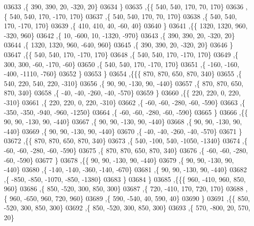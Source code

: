 \begin{DoxyCode}
03633     ,\{   390,   390,    20,  -320,    20\}
03634     \}
03635    ,\{\{   540,   540,   170,    70,   170\}
03636     ,\{   540,   540,   170,  -170,   170\}
03637     ,\{   540,   540,   170,    70,   170\}
03638     ,\{   540,   540,   170,  -170,   170\}
03639     ,\{   410,   410,    40,   -60,    40\}
03640     \}
03641    ,\{\{  1320,  1320,   960,  -320,   960\}
03642     ,\{    10,  -600,    10, -1320,  -970\}
03643     ,\{   390,   390,    20,  -320,    20\}
03644     ,\{  1320,  1320,   960,  -640,   960\}
03645     ,\{   390,   390,    20,  -320,    20\}
03646     \}
03647    ,\{\{   540,   540,   170,  -170,   170\}
03648     ,\{   540,   540,   170,  -170,   170\}
03649     ,\{   300,   300,   -60,  -170,   -60\}
03650     ,\{   540,   540,   170,  -170,   170\}
03651     ,\{  -160,  -160,  -400, -1110,  -760\}
03652     \}
03653    \}
03654   ,\{\{\{   870,   870,   650,   870,   340\}
03655     ,\{   540,   220,   540,   220,  -310\}
03656     ,\{    90,    90,  -130,    90,  -440\}
03657     ,\{   870,   870,   650,   870,   340\}
03658     ,\{   -40,   -40,  -260,   -40,  -570\}
03659     \}
03660    ,\{\{   220,   220,     0,   220,  -310\}
03661     ,\{   220,   220,     0,   220,  -310\}
03662     ,\{   -60,   -60,  -280,   -60,  -590\}
03663     ,\{  -350,  -350,  -940,  -960, -1250\}
03664     ,\{   -60,   -60,  -280,   -60,  -590\}
03665     \}
03666    ,\{\{    90,    90,  -130,    90,  -440\}
03667     ,\{    90,    90,  -130,    90,  -440\}
03668     ,\{    90,    90,  -130,    90,  -440\}
03669     ,\{    90,    90,  -130,    90,  -440\}
03670     ,\{   -40,   -40,  -260,   -40,  -570\}
03671     \}
03672    ,\{\{   870,   870,   650,   870,   340\}
03673     ,\{   540,  -100,   540, -1050, -1340\}
03674     ,\{   -60,   -60,  -280,   -60,  -590\}
03675     ,\{   870,   870,   650,   870,   340\}
03676     ,\{   -60,   -60,  -280,   -60,  -590\}
03677     \}
03678    ,\{\{    90,    90,  -130,    90,  -440\}
03679     ,\{    90,    90,  -130,    90,  -440\}
03680     ,\{  -140,  -140,  -360,  -140,  -670\}
03681     ,\{    90,    90,  -130,    90,  -440\}
03682     ,\{  -850,  -850, -1070,  -850, -1380\}
03683     \}
03684    \}
03685   ,\{\{\{   960,  -410,   960,   850,   960\}
03686     ,\{   850,  -520,   300,   850,   300\}
03687     ,\{   720,  -410,   170,   720,   170\}
03688     ,\{   960,  -650,   960,   720,   960\}
03689     ,\{   590,  -540,    40,   590,    40\}
03690     \}
03691    ,\{\{   850,  -520,   300,   850,   300\}
03692     ,\{   850,  -520,   300,   850,   300\}
03693     ,\{   570,  -800,    20,   570,    20\}

\end{DoxyCode}
